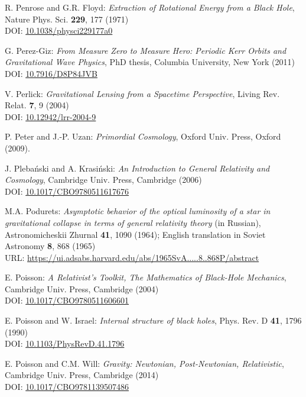 \begin{thebibliography}{123}
R. Penrose and G.R. Floyd: {\em Extraction of Rotational Energy from
a Black Hole},  Nature Phys. Sci. {\bf 229}, 177 (1971)\\
DOI: \href{https://doi.org/10.1038/physci229177a0}{10.1038/physci229177a0}

G. Perez-Giz: {\em From Measure Zero to Measure Hero:
Periodic Kerr Orbits and Gravitational Wave Physics},
PhD thesis, Columbia University, New York (2011)\\
DOI: \href{https://doi.org/10.7916/D8P84JVB}{10.7916/D8P84JVB}

V. Perlick:
{\em Gravitational Lensing from a Spacetime Perspective},
Living Rev. Relat. {\bf 7}, 9 (2004)\\
DOI: \href{https://doi.org/10.12942/lrr-2004-9}{10.12942/lrr-2004-9}

P. Peter and J.-P. Uzan: {\em Primordial Cosmology},
Oxford Univ. Press, Oxford (2009).

J. Pleba\'nski and A. Krasi\'nski:
{\em An Introduction to General Relativity and Cosmology},
Cambridge Univ. Press, Cambridge (2006)\\
DOI: \href{https://doi.org/10.1017/CBO9780511617676}{10.1017/CBO9780511617676}

M.A. Podurets:
{\em Asymptotic behavior of the optical luminosity of a star in gravitational collapse
in terms of general relativity theory}
(in Russian),
Astronomicheskii Zhurnal {\bf 41}, 1090 (1964);
English translation in Soviet Astronomy {\bf 8}, 868 (1965)\\
URL: \url{https://ui.adsabs.harvard.edu/abs/1965SvA.....8..868P/abstract}

E. Poisson: \emph{A Relativist's Toolkit,
The Mathematics of Black-Hole Mechanics},
Cambridge Univ. Press, Cambridge (2004) \\
DOI: \href{https://doi.org/10.1017/CBO9780511606601}{10.1017/CBO9780511606601}

E. Poisson and W. Israel: {\em Internal structure of black holes},
Phys. Rev. D {\bf 41}, 1796 (1990) \\
DOI: \href{https://doi.org/10.1103/PhysRevD.41.1796}{10.1103/PhysRevD.41.1796}

E. Poisson and C.M. Will: {\em Gravity: Newtonian, Post-Newtonian, Relativistic},
Cambridge Univ. Press, Cambridge (2014) \\
DOI: \href{https://doi.org/10.1017/CBO9781139507486}{10.1017/CBO9781139507486}


\end{thebibliography}
